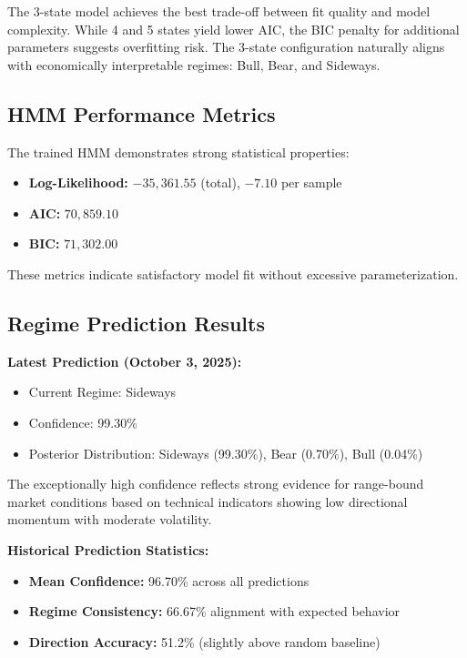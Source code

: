 \documentclass[conference]{IEEEtran}
\begin{document}
The 3-state model achieves the best trade-off between fit quality and model complexity. While 4 and 5 states yield lower AIC, the BIC penalty for additional parameters suggests overfitting risk. The 3-state configuration naturally aligns with economically interpretable regimes: Bull, Bear, and Sideways.

\subsection{HMM Performance Metrics}

The trained HMM demonstrates strong statistical properties:

\begin{itemize}
\item \textbf{Log-Likelihood:} $-35,361.55$ (total), $-7.10$ per sample
\item \textbf{AIC:} $70,859.10$
\item \textbf{BIC:} $71,302.00$
\end{itemize}

These metrics indicate satisfactory model fit without excessive parameterization.

\subsection{Regime Prediction Results}

\textbf{Latest Prediction (October 3, 2025):}
\begin{itemize}
\item Current Regime: Sideways
\item Confidence: 99.30\%
\item Posterior Distribution: Sideways (99.30\%), Bear (0.70\%), Bull (0.04\%)
\end{itemize}

The exceptionally high confidence reflects strong evidence for range-bound market conditions based on technical indicators showing low directional momentum with moderate volatility.

\textbf{Historical Prediction Statistics:}
\begin{itemize}
\item \textbf{Mean Confidence:} 96.70\% across all predictions
\item \textbf{Regime Consistency:} 66.67\% alignment with expected behavior
\item \textbf{Direction Accuracy:} 51.2\% (slightly above random baseline)
\end{itemize}
\end{document}

